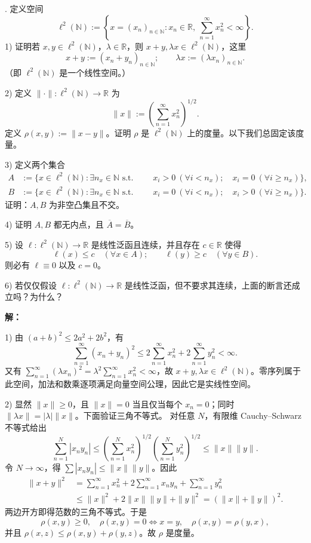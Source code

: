 \documentclass{article}
\begin{document}
\medskip
{}. 定义空间
\[
\ell^2(\mathbb N):=\left\{x=(x_n)_{n\in\mathbb N}:x_n\in\mathbb R,\ \sum_{n=1}^{\infty}x_n^2<\infty\right\}.
\]
1) 证明若 $x,y\in\ell^2(\mathbb N)$，$\lambda\in\mathbb R$，则 $x+y,\lambda x\in\ell^2(\mathbb N)$，这里
\[
x+y:=(x_n+y_n)_{n\in\mathbb N};\qquad
\lambda x:=(\lambda x_n)_{n\in\mathbb N}.
\]
（即 $\ell^2(\mathbb N)$ 是一个线性空间。）

2) 定义 $\|\cdot\|:\ell^2(\mathbb N)\to\mathbb R$ 为
\[
\|x\|:=\left(\sum_{n=1}^{\infty}x_n^2\right)^{1/2}.
\]
定义 $\rho(x,y):=\|x-y\|$。证明 $\rho$ 是 $\ell^2(\mathbb N)$ 上的度量。以下我们总固定该度量。

3) 定义两个集合
\[
\begin{aligned}
A&:=\{x\in\ell^2(\mathbb N):\exists n_x\in\mathbb N\text{ s.t. }\
&\quad x_i>0\ (\forall i<n_x);\quad x_i=0\ (\forall i\ge n_x)\},\\
B&:=\{x\in\ell^2(\mathbb N):\exists n_x\in\mathbb N\text{ s.t. }\
&\quad x_i=0\ (\forall i<n_x);\quad x_i>0\ (\forall i\ge n_x)\}.
\end{aligned}
\]
证明：$A,B$ 为非空凸集且不交。

4) 证明 $A,B$ 都无内点，且 $\overline A=\overline B$。

5) 设 $\ell:\ell^2(\mathbb N)\to\mathbb R$ 是线性泛函且连续，并且存在 $c\in\mathbb R$ 使得
\[
\ell(x)\le c\quad(\forall x\in A);\qquad
\ell(y)\ge c\quad(\forall y\in B).
\]
则必有 $\ell\equiv0$ 以及 $c=0$。

6) 若仅仅假设 $\ell:\ell^2(\mathbb N)\to\mathbb R$ 是线性泛函，但不要求其连续，上面的断言还成立吗？为什么？

\textbf{解：}


1) 由 $(a+b)^2\le2a^2+2b^2$，有
\[
\sum_{n=1}^{\infty}(x_n+y_n)^2
\le2\sum_{n=1}^{\infty}x_n^2+2\sum_{n=1}^{\infty}y_n^2<\infty.
\]
又有 $\sum_{n=1}^{\infty}(\lambda x_n)^2=\lambda^2\sum_{n=1}^{\infty}x_n^2<\infty$，故 $x+y,\lambda x\in\ell^2(\mathbb N)$。零序列属于此空间，加法和数乘逐项满足向量空间公理，因此它是实线性空间。

2) 显然 $\|x\|\ge0$，且 $\|x\|=0$ 当且仅当每个 $x_n=0$；同时 $\|\lambda x\|=|\lambda|\|x\|$。下面验证三角不等式。
对任意 $N$，有限维 Cauchy--Schwarz 不等式给出
\[
\sum_{n=1}^N|x_ny_n|
\le\left(\sum_{n=1}^Nx_n^2\right)^{1/2}
\left(\sum_{n=1}^Ny_n^2\right)^{1/2}
\le\|x\|\|y\|.
\]
令 $N\to\infty$，得 $\sum|x_ny_n|\le\|x\|\|y\|$。因此
\[
\begin{aligned}
\|x+y\|^2
&=\sum_{n=1}^{\infty}x_n^2+2\sum_{n=1}^{\infty}x_ny_n+\sum_{n=1}^{\infty}y_n^2\\
&\le\|x\|^2+2\|x\|\|y\|+\|y\|^2=(\|x\|+\|y\|)^2.
\end{aligned}
\]
两边开方即得范数的三角不等式。于是
\[
\rho(x,y)\ge0,\quad \rho(x,y)=0\iff x=y,\quad
\rho(x,y)=\rho(y,x),
\]
并且 $\rho(x,z)\le\rho(x,y)+\rho(y,z)$。故 $\rho$ 是度量。
\end{document}
